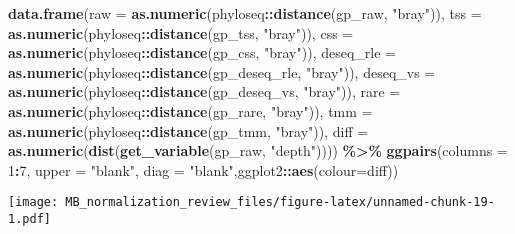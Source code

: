 \documentclass[
]{book}
\newenvironment{Shaded}{\begin{snugshade}}{\end{snugshade}}
\newcommand{\DataTypeTok}[1]{\textcolor[rgb]{0.13,0.29,0.53}{#1}}
\newcommand{\DecValTok}[1]{\textcolor[rgb]{0.00,0.00,0.81}{#1}}
\newcommand{\KeywordTok}[1]{\textcolor[rgb]{0.13,0.29,0.53}{\textbf{#1}}}
\newcommand{\NormalTok}[1]{#1}
\newcommand{\OperatorTok}[1]{\textcolor[rgb]{0.81,0.36,0.00}{\textbf{#1}}}
\newcommand{\StringTok}[1]{\textcolor[rgb]{0.31,0.60,0.02}{#1}}
\begin{document}
\begin{Shaded}
\begin{Highlighting}[]
\KeywordTok{data.frame}\NormalTok{(}\DataTypeTok{raw =} \KeywordTok{as.numeric}\NormalTok{(phyloseq}\OperatorTok{::}\KeywordTok{distance}\NormalTok{(gp\_raw, }\StringTok{"bray"}\NormalTok{)), }
           \DataTypeTok{tss =} \KeywordTok{as.numeric}\NormalTok{(phyloseq}\OperatorTok{::}\KeywordTok{distance}\NormalTok{(gp\_tss, }\StringTok{"bray"}\NormalTok{)), }
           \DataTypeTok{css =} \KeywordTok{as.numeric}\NormalTok{(phyloseq}\OperatorTok{::}\KeywordTok{distance}\NormalTok{(gp\_css, }\StringTok{"bray"}\NormalTok{)),}
           \DataTypeTok{deseq\_rle =} \KeywordTok{as.numeric}\NormalTok{(phyloseq}\OperatorTok{::}\KeywordTok{distance}\NormalTok{(gp\_deseq\_rle, }\StringTok{"bray"}\NormalTok{)),}
           \DataTypeTok{deseq\_vs =} \KeywordTok{as.numeric}\NormalTok{(phyloseq}\OperatorTok{::}\KeywordTok{distance}\NormalTok{(gp\_deseq\_vs, }\StringTok{"bray"}\NormalTok{)),}
           \DataTypeTok{rare =} \KeywordTok{as.numeric}\NormalTok{(phyloseq}\OperatorTok{::}\KeywordTok{distance}\NormalTok{(gp\_rare, }\StringTok{"bray"}\NormalTok{)),}
           \DataTypeTok{tmm =} \KeywordTok{as.numeric}\NormalTok{(phyloseq}\OperatorTok{::}\KeywordTok{distance}\NormalTok{(gp\_tmm, }\StringTok{"bray"}\NormalTok{)),}
           \DataTypeTok{diff =} \KeywordTok{as.numeric}\NormalTok{(}\KeywordTok{dist}\NormalTok{(}\KeywordTok{get\_variable}\NormalTok{(gp\_raw, }\StringTok{"depth"}\NormalTok{)))) }\OperatorTok{\%\textgreater{}\%}\StringTok{ }
\StringTok{    }\KeywordTok{ggpairs}\NormalTok{(}\DataTypeTok{columns =} \DecValTok{1}\OperatorTok{:}\DecValTok{7}\NormalTok{, }\DataTypeTok{upper =} \StringTok{"blank"}\NormalTok{,}
            \DataTypeTok{diag =} \StringTok{"blank"}\NormalTok{,ggplot2}\OperatorTok{::}\KeywordTok{aes}\NormalTok{(}\DataTypeTok{colour=}\NormalTok{diff))}
\end{Highlighting}
\end{Shaded}

\texttt{[image: MB\_normalization\_review\_files/figure-latex/unnamed-chunk-19-1.pdf]}

  
\end{document}
